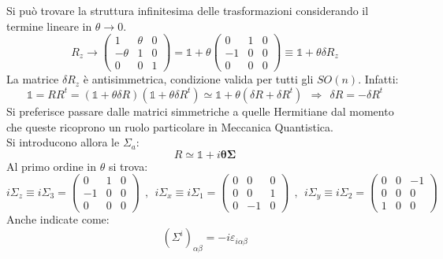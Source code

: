 \documentclass[twoside]{article}
\begin{document}
Si può trovare la struttura infinitesima delle trasformazioni considerando il termine lineare in $\theta \to 0$.
\begin{equation}
    R_z \to \begin{pmatrix}
    1 & \theta & 0 \\
    -\theta & 1 & 0 \\
    0 & 0 & 1
    \end{pmatrix}=\mathds{1}+\theta \begin{pmatrix}
    0 & 1 & 0 \\
    -1 & 0 & 0 \\
    0 & 0 & 0
    \end{pmatrix} \equiv \mathds{1}+\theta \delta R_z
\end{equation}
La matrice $\delta R_z$ è antisimmetrica, condizione valida per tutti gli $SO(n)$. Infatti:
\begin{equation}
    \mathds{1}=RR^t=(\mathds{1}+\theta \delta R)(\mathds{1}+\theta \delta R^t)\simeq \mathds{1}+\theta (\delta R+\delta R^t) \ \ \Rightarrow \ \ \delta R = - \delta R^t
\end{equation}
Si preferisce passare dalle matrici simmetriche a quelle Hermitiane dal momento che queste ricoprono un ruolo particolare in Meccanica Quantistica.
\\
Si introducono allora le $\Sigma_a$:
\begin{equation}
    R\simeq \mathds{1}+i\bm{\theta} \bm{\Sigma}
\end{equation}
Al primo ordine in $\theta$ si trova:
\begin{equation}
    i\Sigma_z \equiv i \Sigma_3 = \begin{pmatrix}
    0 & 1 & 0 \\
    -1 & 0 & 0 \\
    0 & 0 & 0
    \end{pmatrix} \ \ , \ \ i\Sigma_x \equiv i \Sigma_1 = \begin{pmatrix}
    0 & 0 & 0 \\
    0 & 0 & 1 \\
    0 & -1 & 0
    \end{pmatrix} \ \ , \ \ i\Sigma_y \equiv i \Sigma_2 = \begin{pmatrix}
    0 & 0 & -1 \\
    0 & 0 & 0 \\
    1 & 0 & 0
    \end{pmatrix}
\end{equation}
Anche indicate come:
\begin{equation}
    (\Sigma^i)_{\alpha \beta}=-i \varepsilon_{i \alpha \beta}
\end{equation}
\end{document}

